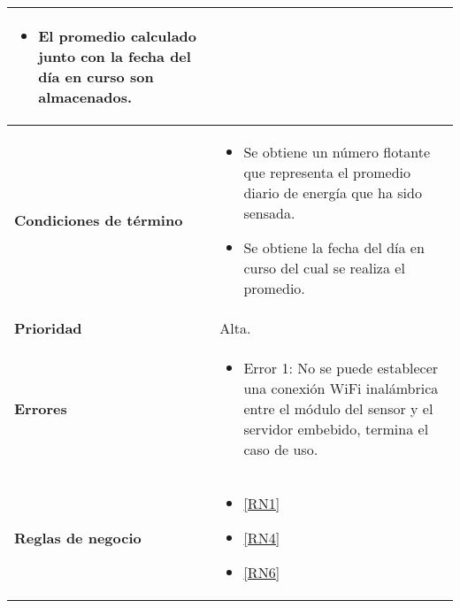 \begin{longtable}{|J{5cm}|J{10.3cm}|}
		\begin{itemize}
			\item El promedio calculado junto con la fecha del día en curso son almacenados.
		\end{itemize}\\ \hline
	\textbf{Condiciones de término} & 
		\begin{itemize}
			\item Se obtiene un número flotante que representa el promedio diario de energía que ha sido sensada.
			\item Se obtiene la fecha del día en curso del cual se realiza el promedio.
		\end{itemize} \\ \hline 
	\textbf{Prioridad} & 
		Alta. \\ \hline
	\textbf{Errores} & 
		\begin{itemize}
			\item \label{SUB-M-CU1:Error1} Error 1: No se puede establecer una conexión WiFi inalámbrica entre el módulo del sensor y el servidor embebido, termina el caso de uso.
		\end{itemize} \\ \hline
	\textbf{Reglas de negocio} & 
		\begin{itemize}
		    \item \ref{RN1}
			\item \ref{RN4}
			\item \ref{RN6}
		\end{itemize} \\ \hline

\end{longtable}

